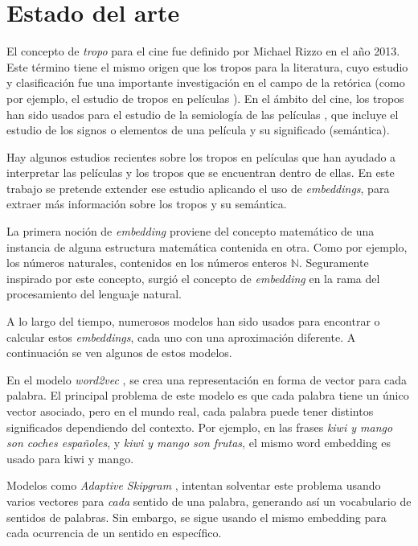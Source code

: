 \chapter{Estado del arte}

El concepto de \emph{tropo} para el cine fue definido por Michael Rizzo \cite{rizzo2013art} en el año 2013. Este término
tiene el mismo origen que los tropos para la literatura, cuyo estudio y clasificación fue una importante investigación en el
campo de la retórica (como por ejemplo, el estudio de tropos en películas \cite{nelson1998tropes}). En el ámbito del cine,
los tropos han sido usados para el estudio de la semiología de las películas \cite{howtoreadafilm}, que incluye el estudio
de los signos o elementos de una película y su significado (semántica).

Hay algunos estudios recientes sobre los tropos en películas \cite{garcia2018overview} que han ayudado a interpretar las
películas y los tropos que se encuentran dentro de ellas. En este trabajo se pretende extender ese estudio aplicando el uso
de \emph{embeddings}, para extraer más información sobre los tropos y su semántica.

La primera noción de \textit{embedding} proviene del concepto matemático de una instancia de alguna
estructura matemática contenida en otra. Como por ejemplo, los números naturales, contenidos en los números enteros
$\mathbb{N}$. Seguramente inspirado por este concepto, surgió el concepto de \textit{embedding} en la rama del procesamiento
del lenguaje natural.

A lo largo del tiempo, numerosos modelos han sido usados para encontrar o calcular estos \textit{embeddings}, cada uno
con una aproximación diferente. A continuación se ven algunos de estos modelos.

En el modelo \emph{word2vec} \cite{word2vec:1} \cite{word2vec:2}, se crea una representación
en forma de vector para cada palabra. El principal problema de este modelo es que cada palabra tiene un único vector asociado,
pero en el mundo real, cada palabra puede tener distintos significados dependiendo del contexto.
Por ejemplo, en las frases \emph{kiwi y mango son coches españoles}, y \emph{kiwi y mango son frutas},
el mismo word embedding es usado para kiwi y mango.

Modelos como \emph{Adaptive Skipgram} \cite{adaptiveskipgram}, intentan solventar este problema usando
varios vectores para \emph{cada} sentido de una palabra, generando así un vocabulario de sentidos de palabras.
Sin embargo, se sigue usando el mismo embedding para cada ocurrencia de un sentido en específico.

